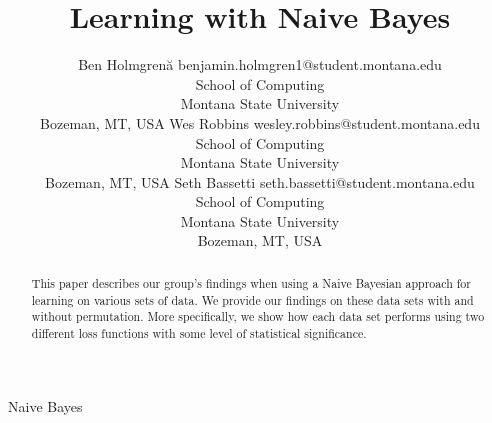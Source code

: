 \documentclass[twoside,11pt]{article}
\begin{document}
\title{Learning with Naive Bayes}

\author{\name Ben Holmgren\u{a} \email benjamin.holmgren1@student.montana.edu \\
       \addr School of Computing\\
       Montana State University\\
       Bozeman, MT, USA
       \AND
       \name Wes Robbins \email wesley.robbins@student.montana.edu \\
       \addr School of Computing\\
       Montana State University\\
       Bozeman, MT, USA
       \AND
       \name Seth Bassetti \email seth.bassetti@student.montana.edu \\
       \addr School of Computing\\
       Montana State University\\
       Bozeman, MT, USA}

\maketitle

\begin{abstract}%
This paper describes our group's findings when using a Naive Bayesian
approach for learning on various sets of data. We provide our findings on
these data sets with and without permutation. More specifically, we show
how each data set performs using two different loss functions with some
level of statistical significance. 
\end{abstract}


\begin{keywords}
  Naive Bayes
\end{keywords}


\vskip 0.2in

\end{document}
